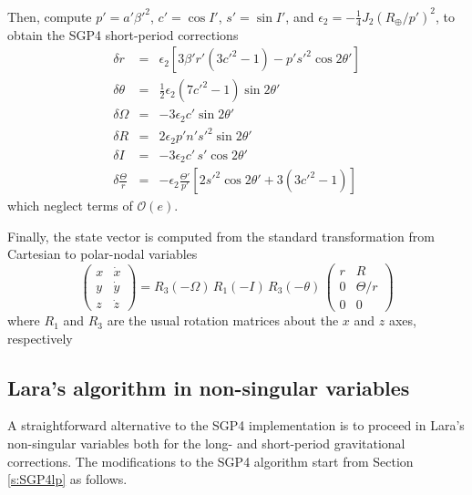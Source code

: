 \documentclass{article}
\begin{document}
Then, compute $p'=a'\beta'^2$, $c'=\cos{I}'$, $s'=\sin{I}'$, and $\epsilon_2=-\frac{1}{4}J_2(R_\oplus/p')^2$, to obtain the SGP4 short-period corrections
\begin{eqnarray*}
\delta r &=& \epsilon_2\left[3\beta'r'(3c'^2-1)-p's'^2\cos2\theta'\right] \\
\delta \theta &=& \frac{1}{2}\epsilon_2(7c'^2-1)\sin{2\theta'} \\
\delta \Omega &=& -3\epsilon_2 c'\sin2\theta' \\
\delta R &=& 2\epsilon_2 p'n's'^2\sin2\theta' \\
\delta I &=& -3\epsilon_2 c'\,s'\cos2\theta' \\
\delta \frac{\Theta}{r} &=&
- \epsilon_2\frac{\Theta'}{p'}\left[2s'^2\cos2\theta'+3\left(3c'^2-1\right)\right]
\end{eqnarray*}
which neglect terms of $\mathcal{O}(e)$.


Finally, the state vector is computed from the standard transformation from Cartesian to polar-nodal variables
\[ %
\left(\begin{array}{cc} x & \dot{x} \\ y & \dot{y} \\ z & \dot{z} \end{array}\right)=
R_3(-\Omega)\,{R}_1(-I)\,{R}_3(-\theta)\,\left(\begin{array}{cc} r & R \\ 0 & \Theta/r \\ 0 & 0 \end{array}\right)
\] %
where $R_1$ and $R_3$ are the usual rotation matrices about the $x$ and $z$ axes, respectively


\subsection{Lara's algorithm in non-singular variables} \label{sec:lara}

A straightforward alternative to the SGP4 implementation is to proceed in Lara's non-singular variables \cite{Lara2015MPE} both for the long- and short-period gravitational corrections. The modifications to the SGP4 algorithm start from Section \ref{s:SGP4lp} as follows.
\end{document}
